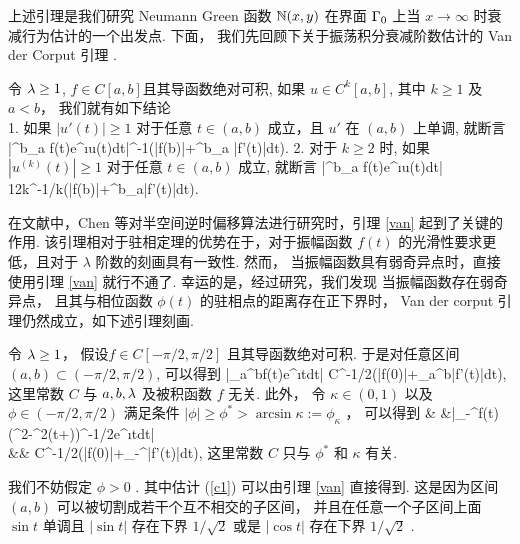  上述引理是我们研究 Neumann Green 函数 $\mathbb{N}(x,y)$ 在界面 $\Gamma_0$ 上当 $x\to\infty$ 时衰减行为估计的一个出发点.  下面， 我们先回顾下关于振荡积分衰减阶数估计的 Van der Corput 引理 \cite[P.152]{grafakos} . 
 
 \begin{lem}\label{van}
 	令 $\lambda\ge 1$, $f\in C[a,b]$且其导函数绝对可积, 如果 $u\in C^k[a,b]$, 其中 $k\ge 1$ 及 $a<b$， 我们就有如下结论 \\
 	{\rm 1}. 如果 $|u'(t)|\ge 1$ 对于任意 $t\in (a,b)$ 成立，且 $u'$ 在 $(a,b)$ 上单调, 就断言
 	\ben
 	\left|\int^b_a f(t)e^{\i\lambda u(t)}dt\right|\lambda^{-1}\left(|f(b)|+\int^b_a |f'(t)|dt\right).
 	\een
 	{\rm 2}. 对于 $k\geq2$ 时, 如果 $|u^{(k)}(t)|\ge 1$ 对于任意 $t\in (a,b)$ 成立, 就断言 
 	\ben
 	\left|\int^b_a f(t)e^{\i\lambda u(t)}dt\right|\le
 	12k\lambda^{-1/k}\left(|f(b)|+\int^b_a|f'(t)|dt\right).
 	\een
 \end{lem}

在文献\cite{RTMhalf_aco}中，Chen 等对半空间逆时偏移算法进行研究时，引理 \ref{van} 起到了关键的作用. 该引理相对于驻相定理的优势在于，对于振幅函数 $f(t)$ 的光滑性要求更低，且对于 $\lambda$ 阶数的刻画具有一致性. 然而， 当振幅函数具有弱奇异点时，直接使用引理 \ref{van} 就行不通了.  幸运的是，经过研究，我们发现 当振幅函数存在弱奇异点， 且其与相位函数 $\phi(t)$ 的驻相点的距离存在正下界时， Van der corput 引理仍然成立，如下述引理刻画. 


\begin{lem}\label{lem:2.5}
	令 $\lambda\ge 1$， 假设$f\in C[-\pi/2,\pi/2]$ 且其导函数绝对可积.  于是对任意区间 $(a,b)\subset (-\pi/2,\pi/2)$, 可以得到
	\be\label{c1}
	\left|\int_a^bf(t)e^{\i\lam\cos t}dt\right| 
	\leq C\lam^{-1/2}\left(|f(0)|+\int_a^b|f'(t)|dt\right),
	\ee
	这里常数 $C$ 与 $a,b,\lambda$ 及被积函数 $f$ 无关.  
	此外， 令 $\kappa\in (0,1)$ 以及 $\phi\in (-\pi/2,\pi/2)$ 满足条件 $|\phi|\geq\phi^*>\arcsin \kappa:=\phi_\kappa$ ， 可以得到
	\be\label{c3}
	 & &\left|\int_{-\frac{}}^{\frac{}}f(t)(\kappa^2-\sin^2(t+\phi))^{-1/2}e^{\i\lam\cos t}dt\right|  \\ \nn
	&\leq& C\lam^{-1/2}\left(|f(0)|+\int_{-\frac{}}^{\frac {}}|f'(t)|dt\right),
	\ee
	这里常数 $C$ 只与 $\phi^*$ 和 $\kappa$ 有关. 
\end{lem}
\debproof
我们不妨假定 $\phi>0$ . 
其中估计 (\ref{c1}) 可以由引理 \ref{van} 直接得到.  这是因为区间 $(a,b)$ 可以被切割成若干个互不相交的子区间， 并且在任意一个子区间上面 $\sin t$ 单调且 $|\sin t|$ 存在下界 $1/\sqrt 2$ 或是 $|\cos t|$ 存在下界 $1/\sqrt 2$ . 

